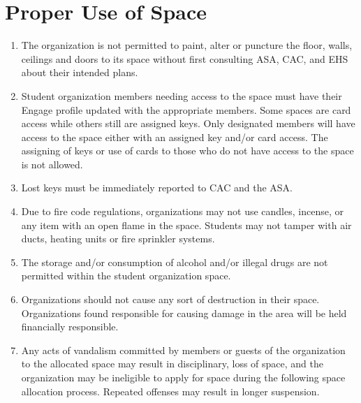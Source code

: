 \documentclass[12pt]{constitution}
\begin{document}
\section{Proper Use of Space}
\begin{enumerate}
    \item The organization is not permitted to paint, alter or puncture the floor, walls, ceilings and doors
        to its space without first consulting ASA, CAC, and EHS about their intended plans.
    
    \item Student organization members needing access to the space must have their Engage profile updated
        with the appropriate members.
    Some spaces are card access while others still are assigned keys.
    Only designated members will have access to the space either with an assigned key and/or card access.
    The assigning of keys or use of cards to those who do not have access to the space is not allowed.

    \item Lost keys must be immediately reported to CAC and the ASA. 
    
    \item Due to fire code regulations, organizations may not use candles, incense, or any item with an
        open flame in the space.
    Students may not tamper with air ducts, heating units or fire sprinkler systems.

    \item The storage and/or consumption of alcohol and/or illegal drugs are not permitted within the
        student organization space.
    
    \item Organizations should not cause any sort of destruction in their space.
    Organizations found responsible for causing damage in the area will be held financially responsible.

    \item Any acts of vandalism committed by members or guests of the organization to the allocated
        space may result in disciplinary, loss of space, and the organization may be ineligible
        to apply for space during the following space allocation process.
    Repeated offenses may result in longer suspension.
\end{enumerate}
\end{document}
